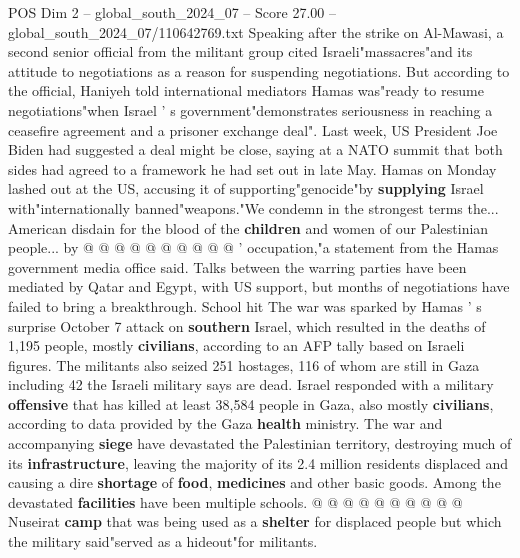 \begin{textsample}{POS Dim 2 – global\_south\_2024\_07 – Score 27.00 – global\_south\_2024\_07/110642769.txt}
Speaking after the strike on Al-Mawasi, a second senior official from the militant group cited Israeli"massacres"and its attitude to negotiations as a reason for suspending negotiations.
But according to the official, Haniyeh told international mediators Hamas was"ready to resume negotiations"when Israel ' s government"demonstrates seriousness in reaching a ceasefire agreement and a prisoner exchange deal".
Last week, US President Joe Biden had suggested a deal might be close, saying at a NATO summit that both sides had agreed to a framework he had set out in late May.
Hamas on Monday lashed out at the US, accusing it of supporting"genocide"by \textbf{supplying} Israel with"internationally banned"weapons."We condemn in the strongest terms the...
American disdain for the blood of the \textbf{children} and women of our Palestinian people... by @ @ @ @ @ @ @ @ @ @ ' occupation,"a statement from the Hamas government media office said.
Talks between the warring parties have been mediated by Qatar and Egypt, with US support, but months of negotiations have failed to bring a breakthrough.
School hit The war was sparked by Hamas ' s surprise October 7 attack on \textbf{southern} Israel, which resulted in the deaths of 1,195 people, mostly \textbf{civilians}, according to an AFP tally based on Israeli figures.
The militants also seized 251 hostages, 116 of whom are still in Gaza including 42 the Israeli military says are dead.
Israel responded with a military \textbf{offensive} that has killed at least 38,584 people in Gaza, also mostly \textbf{civilians}, according to data provided by the Gaza \textbf{health} ministry.
The war and accompanying \textbf{siege} have devastated the Palestinian territory, destroying much of its \textbf{infrastructure}, leaving the majority of its 2.4 million residents displaced and causing a dire \textbf{shortage} of \textbf{food}, \textbf{medicines} and other basic goods.
Among the devastated \textbf{facilities} have been multiple schools. @ @ @ @ @ @ @ @ @ @ Nuseirat \textbf{camp} that was being used as a \textbf{shelter} for displaced people but which the military said"served as a hideout"for militants.

\end{textsample}
